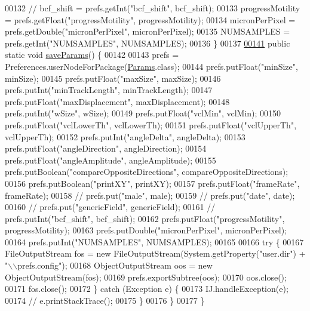 \begin{DoxyCode}
00132 \textcolor{comment}{//    bcf\_shift = prefs.getInt("bcf\_shift", bcf\_shift);}
00133     progressMotility = prefs.getFloat(\textcolor{stringliteral}{"progressMotility"}, progressMotility);
00134     micronPerPixel = prefs.getDouble(\textcolor{stringliteral}{"micronPerPixel"}, micronPerPixel);
00135     NUMSAMPLES = prefs.getInt(\textcolor{stringliteral}{"NUMSAMPLES"}, NUMSAMPLES);
00136   \}
00137 
\hypertarget{_params_8java_source_l00141}{}\hyperlink{classdata_1_1_params_a523f79a85b888809ee8b6220ef0e20d1}{00141}   \textcolor{keyword}{public} \textcolor{keyword}{static} \textcolor{keywordtype}{void} \hyperlink{classdata_1_1_params_a523f79a85b888809ee8b6220ef0e20d1}{saveParams}() \{
00142 
00143     prefs = Preferences.userNodeForPackage(\hyperlink{classdata_1_1_params}{Params}.class);
00144     prefs.putFloat(\textcolor{stringliteral}{"minSize"}, minSize);
00145     prefs.putFloat(\textcolor{stringliteral}{"maxSize"}, maxSize);
00146     prefs.putInt(\textcolor{stringliteral}{"minTrackLength"}, minTrackLength);
00147     prefs.putFloat(\textcolor{stringliteral}{"maxDisplacement"}, maxDisplacement);
00148     prefs.putInt(\textcolor{stringliteral}{"wSize"}, wSize);
00149     prefs.putFloat(\textcolor{stringliteral}{"vclMin"}, vclMin);
00150     prefs.putFloat(\textcolor{stringliteral}{"vclLowerTh"}, vclLowerTh);
00151     prefs.putFloat(\textcolor{stringliteral}{"vclUpperTh"}, vclUpperTh);
00152     prefs.putInt(\textcolor{stringliteral}{"angleDelta"}, angleDelta);
00153     prefs.putFloat(\textcolor{stringliteral}{"angleDirection"}, angleDirection);
00154     prefs.putFloat(\textcolor{stringliteral}{"angleAmplitude"}, angleAmplitude);
00155     prefs.putBoolean(\textcolor{stringliteral}{"compareOppositeDirections"}, compareOppositeDirections);
00156     prefs.putBoolean(\textcolor{stringliteral}{"printXY"}, printXY);
00157     prefs.putFloat(\textcolor{stringliteral}{"frameRate"}, frameRate);
00158 \textcolor{comment}{//    prefs.put("male", male);}
00159 \textcolor{comment}{//    prefs.put("date", date);}
00160 \textcolor{comment}{//    prefs.put("genericField", genericField);}
00161 \textcolor{comment}{//    prefs.putInt("bcf\_shift", bcf\_shift);}
00162     prefs.putFloat(\textcolor{stringliteral}{"progressMotility"}, progressMotility);
00163     prefs.putDouble(\textcolor{stringliteral}{"micronPerPixel"}, micronPerPixel);
00164     prefs.putInt(\textcolor{stringliteral}{"NUMSAMPLES"}, NUMSAMPLES);
00165 
00166     \textcolor{keywordflow}{try} \{
00167       FileOutputStream fos = \textcolor{keyword}{new} FileOutputStream(System.getProperty(\textcolor{stringliteral}{"user.dir"}) + \textcolor{stringliteral}{"\(\backslash\)\(\backslash\)prefs.config"});
00168       ObjectOutputStream oos = \textcolor{keyword}{new} ObjectOutputStream(fos);
00169       prefs.exportSubtree(oos);
00170       oos.close();
00171       fos.close();
00172     \} \textcolor{keywordflow}{catch} (Exception e) \{
00173       IJ.handleException(e);
00174 \textcolor{comment}{//      e.printStackTrace();}
00175     \}
00176   \}
00177 \}
\end{DoxyCode}
